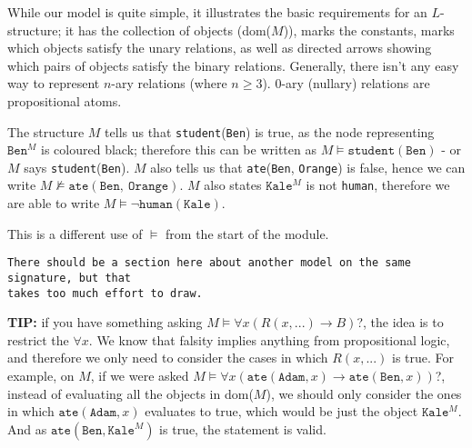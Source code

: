 \documentclass[a4paper, 12pt]{article}
\begin{document}
        While our model is quite simple, it illustrates the basic requirements for an $L$-structure; it has the collection of objects (dom($M$)), marks the constants, marks which objects satisfy the unary relations, as well as directed arrows showing which pairs of objects satisfy the binary relations. Generally, there isn't any easy way to represent $n$-ary relations (where $n \geq 3$). 0-ary (nullary) relations are propositional atoms.
        \medskip

        The structure $M$ tells us that \texttt{student}(\texttt{Ben}) is true, as the node representing $\texttt{Ben}^M$ is coloured black; therefore this can be written as $M \vDash \texttt{student}(\texttt{Ben})$ - or $M$ says \texttt{student}(\texttt{Ben}). $M$ also tells us that \texttt{ate}(\texttt{Ben}, \texttt{Orange}) is false, hence we can write $M \nvDash \texttt{ate}(\texttt{Ben},\ \texttt{Orange})$. $M$ also states $\texttt{Kale}^M$ is not \texttt{human}, therefore we are able to write $M \vDash \neg \texttt{human}(\texttt{Kale})$.
        \medskip

        This is a different use of $\vDash$ from the start of the module.
        \medskip

        \texttt{There should be a section here about another model on the same signature, but that \\ takes too much effort to draw.}
        \medskip

        \textbf{TIP:} if you have something asking $M \vDash \forall x (R(x, ...) \rightarrow B)$?, the idea is to restrict the $\forall x$. We know that falsity implies anything from propositional logic, and therefore we only need to consider the cases in which $R(x, ...)$ is true. For example, on $M$, if we were asked $M \vDash \forall x (\texttt{ate}(\texttt{Adam}, x) \rightarrow \texttt{ate}(\texttt{Ben}, x))$?, instead of evaluating all the objects in dom($M$), we should only consider the ones in which $\texttt{ate}(\texttt{Adam}, x)$ evaluates to true, which would be just the object $\texttt{Kale}^M$. And as $\texttt{ate}(\texttt{Ben}, \texttt{Kale}^M)$ is true, the statement is valid.
        \medskip
\end{document}
